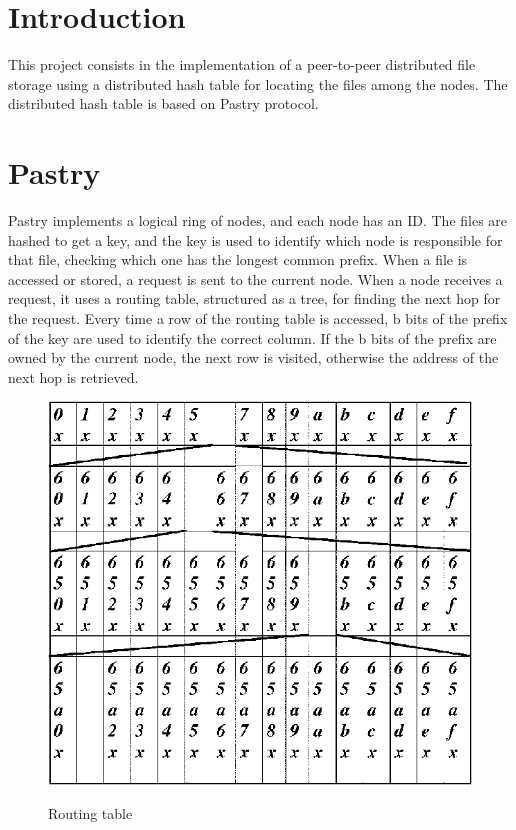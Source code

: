 \documentclass{article}
\begin{document}
\tableofcontents
\newpage

\section{Introduction}

This project consists in the implementation of a peer-to-peer distributed 
file storage using a distributed hash table for locating the files among the nodes. 
The distributed hash table is based on Pastry protocol.

\section{Pastry}

Pastry implements a logical ring of nodes, and each node has an ID. The files are hashed to get a key, 
and the key is used to identify which node is responsible for that file, 
checking which one has the longest common prefix. 
When a file is accessed or stored, a request is sent to the current node. 
When a node receives a request, it uses a routing table, structured as a tree, 
for finding the next hop for the request. Every time a row of the routing table is accessed, 
b bits of the prefix of the key are used to identify the correct column. If the b bits of the 
prefix are owned by the current node, the next row is visited, 
otherwise the address of the next hop is retrieved.

\begin{figure}[H]
    \includegraphics[width=12cm, center]{images/pastry_rt.png}
    \label{fig:3unac}
    \caption{Routing table}
\end{figure}
\end{document}
